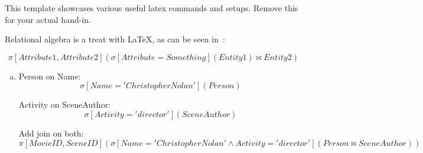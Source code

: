 \documentclass{article}
\begin{document}
\printfront

This template showcases various useful latex commands and setups.
Remove this for your actual hand-in.

\task{}
Relational algebra is a treat with \LaTeX, as can be seen in~:

\begin{equation}
\label{eq:ans}
\pi\left[Attribute1,Attribute2\right](\sigma\left[Attribute=Something\right](Entity1) \Join Entity2)
\end{equation}

\task{}

\begin{enumerate}[(a)]
\item 
Person on Name:
\begin{equation}
\label{eq:a1}
\sigma\left[Name='Christopher Nolan'\right](Person)
\end{equation}

Activity on SceneAuthor:
\begin{equation}
\label{eq:a2}
\sigma\left[Activity='director'\right](SceneAuthor)
\end{equation}

Add join on both:
\begin{equation}
\label{eq:a-compact}
\pi\left[MovieID,SceneID\right](\sigma\left[Name='Christopher Nolan' \land Activity='director'\right]
  (Person \Join SceneAuthor))
\end{equation}


\end{enumerate}
\end{document}
